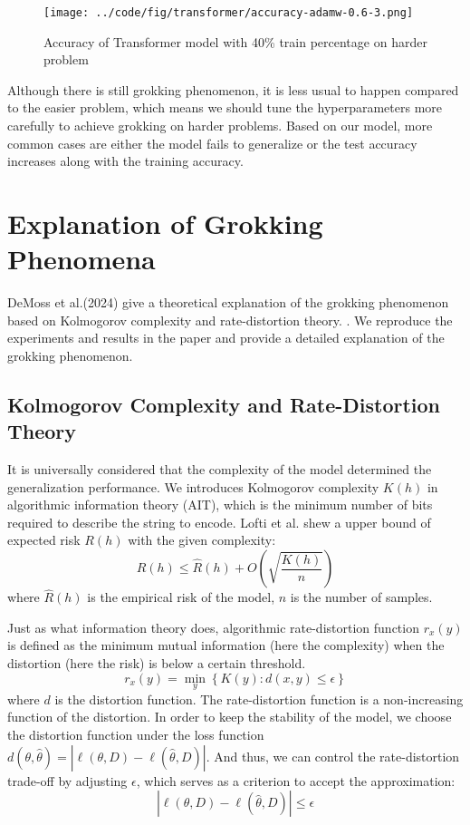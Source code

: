 \documentclass{article}
\begin{document}
\begin{figure}[ht]
    \centering
    \texttt{[image: ../code/fig/transformer/accuracy-adamw-0.6-3.png]}
    \caption{Accuracy of Transformer model with 40\% train percentage on harder problem}
    \label{fig:transformer-harder}
\end{figure}

Although there is still grokking phenomenon, it is less usual to happen compared to the easier problem, which means we should tune the hyperparameters more carefully to achieve grokking on harder problems. Based on our model, more common cases are either the model fails to generalize or the test accuracy increases along with the training accuracy.

\section{Explanation of Grokking Phenomena}

DeMoss et al.(2024) give a theoretical explanation of the grokking phenomenon based on Kolmogorov complexity and rate-distortion theory. \cite{demoss2024complexity}. We reproduce the experiments and results in the paper and provide a detailed explanation of the grokking phenomenon. 

\subsection{Kolmogorov Complexity and Rate-Distortion Theory}

It is universally considered that the complexity of the model determined the generalization performance. We introduces Kolmogorov complexity $K(h)$ in algorithmic information theory (AIT), which is the minimum number of bits required to describe the string to encode. Lofti et al. shew a upper bound of expected risk $R(h)$ with the given complexity:
$$
R(h) \leq \hat{R}(h) + O\left(\sqrt{\frac{K(h)}{n}}\right)
$$
where $\hat{R}(h)$ is the empirical risk of the model, $n$ is the number of samples. 

Just as what information theory does, algorithmic rate-distortion function $r_x(y)$ is defined as the minimum mutual information (here the complexity) when the distortion (here the risk) is below a certain threshold. 
$$
r_x(y) = \min_y\left\{ K(y): d(x, y) \le \epsilon \right\}
$$
where $d$ is the distortion function. The rate-distortion function is a non-increasing function of the distortion. In order to keep the stability of the model, we choose the distortion function under the loss function $d(\theta, \hat{\theta}) = | \ell(\theta, D) - \ell(\hat{\theta}, D) |$. And thus, we can control the rate-distortion trade-off by adjusting $\epsilon$, which serves as a criterion to accept the approximation:
$$
\left| \ell(\theta, D) - \ell(\hat{\theta}, D) \right| \le \epsilon
$$
\end{document}

